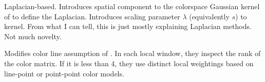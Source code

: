 \documentclass{beamer}
\begin{document}
\begin{frame}[allowframebreaks]{\cite{duchenne2008segmentation}}
 Laplacian-based.
 Introduces spatial component to the colorspace Gaussian kernel of
 \cite{grady2005random} to define the Laplacian.
 Introduces scaling parameter $\lambda$ (equivalently $s$) to kernel.
 From what I can tell, this is just mostly explaining Laplacian methods. Not much novelty.
\end{frame}

\begin{frame}[allowframebreaks]{\cite{singaraju2009new}}
 Modifies color line assumption of \cite{levin2008closed}.
 In each local window, they inspect the rank of the color matrix.
 If it is less than 4, they use distinct local weightings based on line-point
 or point-point color models.
\end{frame}
\end{document}
